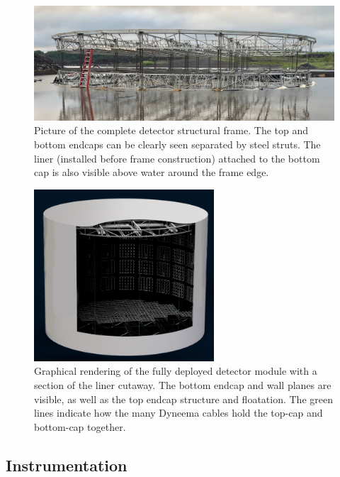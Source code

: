 \begin{figure} %
    \includegraphics[width=\textwidth]{diagrams/4-chips/frame.jpeg}
    \caption[Picture of the \chipsfive detector structure.]
    {Picture of the complete \chipsfive detector structural frame. The top and bottom endcaps can
        be clearly seen separated by steel struts. The liner (installed before frame construction)
        attached to the bottom cap is also visible above water around the frame edge.}
    \label{fig:frame}
\end{figure}

\begin{figure} %
    \includegraphics[width=0.6\textwidth]{diagrams/4-chips/chips_render_1.png}
    \caption[Graphical rendering of the \chipsfive detector.]
    {Graphical rendering of the fully deployed \chipsfive detector module with a section of the
        liner cutaway. The bottom endcap and wall planes are visible, as well as the top endcap
        structure and floatation. The green lines indicate how the many Dyneema cables hold the
        top-cap and bottom-cap together.}
    \label{fig:chips_render}
\end{figure}

\subsection{Instrumentation} %
\label{sec:chips_detector_instrumentation} %

